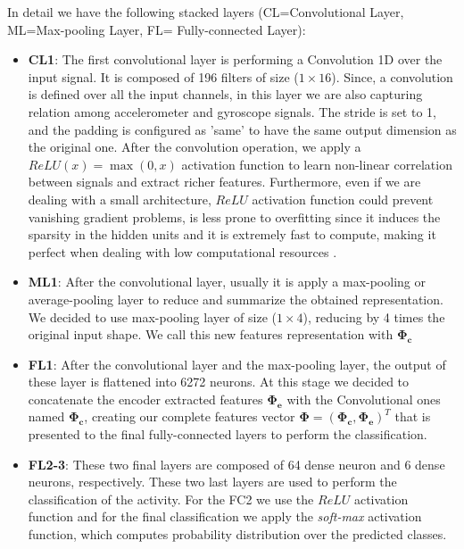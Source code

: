 In detail we have the following stacked layers (CL=Convolutional Layer, ML=Max-pooling Layer, FL= Fully-connected Layer):
\begin{itemize}
	\item \textbf{CL1}: The first convolutional layer is performing a Convolution 1D over the input signal. It is composed of 196 filters of size ($1\times16$). Since, a convolution is defined over all the input channels, in this layer we are also capturing relation among accelerometer and gyroscope signals. The stride is set to 1, and the padding is configured as 'same' to have the same output dimension as the original one. After the convolution operation, we apply a $ReLU(x)=\max(0,x)$ activation function to learn non-linear correlation between signals and extract richer features. Furthermore, even if we are dealing with a small architecture, $ReLU$ activation function could prevent vanishing gradient problems, is less prone to overfitting since it induces the sparsity in the hidden units and it is extremely fast to compute, making it perfect when dealing with low computational resources \cite{ignatov2018real}.
	\item \textbf{ML1}: After the convolutional layer, usually it is apply a max-pooling or average-pooling layer to reduce and summarize the obtained representation. We decided to use max-pooling layer of size ($1\times4$), reducing by 4 times the original input shape. We call this new features representation with $ \boldsymbol{\Phi_{\text{c}} }$
	\item \textbf{FL1}: After the convolutional layer and the max-pooling layer, the output of these layer is flattened into 6272 neurons. At this stage we decided to concatenate the encoder extracted features $ \boldsymbol{\Phi_{\text{e}}} $ with the Convolutional ones named $\boldsymbol{\Phi_{\text{c}}}$, creating our complete features vector $\boldsymbol{\Phi} = (\boldsymbol{\Phi_{\text{c}}}, \boldsymbol{\Phi_{\text{e}}})^T$ that is presented to the final fully-connected layers to perform the classification.
	\item \textbf{FL2-3}: These two final layers are composed of 64 dense neuron and 6 dense neurons, respectively. These two last layers are used to perform the classification of the activity. For the FC2 we use the $ReLU$ activation function and for the final classification we apply the \textit{soft-max} activation function, which computes probability distribution over the predicted classes.
\end{itemize}

